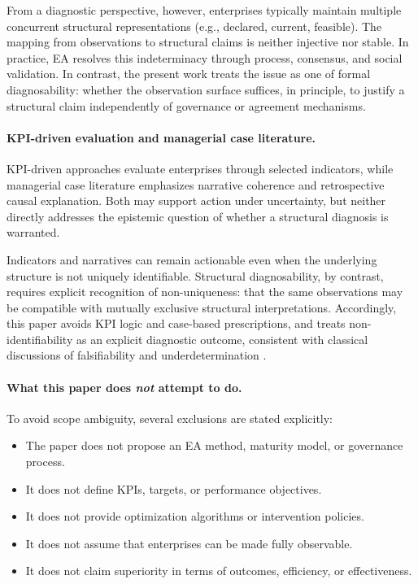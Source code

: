 From a diagnostic perspective, however, enterprises typically maintain multiple concurrent structural representations (e.g., declared, current, feasible).
The mapping from observations to structural claims is neither injective nor stable.
In practice, EA resolves this indeterminacy through process, consensus, and social validation.
In contrast, the present work treats the issue as one of formal diagnosability: whether the observation surface suffices, in principle, to justify a structural claim independently of governance or agreement mechanisms.

\paragraph{KPI-driven evaluation and managerial case literature.}
KPI-driven approaches evaluate enterprises through selected indicators, while managerial case literature emphasizes narrative coherence and retrospective causal explanation.
Both may support action under uncertainty, but neither directly addresses the epistemic question of whether a structural diagnosis is warranted.

Indicators and narratives can remain actionable even when the underlying structure is not uniquely identifiable.
Structural diagnosability, by contrast, requires explicit recognition of non-uniqueness: that the same observations may be compatible with mutually exclusive structural interpretations.
Accordingly, this paper avoids KPI logic and case-based prescriptions, and treats non-identifiability as an explicit diagnostic outcome, consistent with classical discussions of falsifiability and underdetermination \cite{popper1959_logic,quine1951_two_dogmas}.

\paragraph{What this paper does \emph{not} attempt to do.}
To avoid scope ambiguity, several exclusions are stated explicitly:
\begin{itemize}
  \item The paper does not propose an EA method, maturity model, or governance process.
  \item It does not define KPIs, targets, or performance objectives.
  \item It does not provide optimization algorithms or intervention policies.
  \item It does not assume that enterprises can be made fully observable.
  \item It does not claim superiority in terms of outcomes, efficiency, or effectiveness.
\end{itemize}

